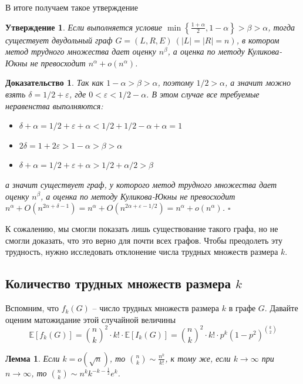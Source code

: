 \documentclass[a4paper]{article}
\newtheorem*{mclaim}{Утверждение}
\newtheorem*{mlemma}{Лемма}
\newtheorem*{msolution}{Доказательство}
\begin{document}
В итоге получаем такое утверждение 
\begin{mclaim}
    Если выполняется условие $\min\left\{\frac{1+\alpha}{2},1-\alpha\right\} > \beta > \alpha$, тогда 
    существует двудольный граф $G = (L, R, E)\ (|L| = |R| = n)$, в котором метод трудного множества 
    дает оценку $n^\beta$, а оценка по методу Куликова-Юкны не превосходит $n^\alpha + o(n^{\alpha})$.
\end{mclaim}
\begin{msolution}
    Так как $1-\alpha > \beta > \alpha$, поэтому $1/2 > \alpha$, а значит можно взять $\delta = 1/2 +
    \varepsilon$, где $0 < \varepsilon < 1/2 - \alpha$. В этом случае все требуемые неравенства выполняются:
    \begin{itemize}[noitemsep]
        \item $\delta + \alpha = 1/2 + \varepsilon + \alpha < 1/2 + 1/2 - \alpha + \alpha = 1$
        \item $2\delta = 1 + 2\varepsilon > 1 - \alpha > \beta > \alpha$
        \item $\delta + \alpha = 1/2 + \varepsilon + \alpha > 1/2 + \alpha/2 > \beta$
    \end{itemize}
    а значит существует граф, у которого метод трудного множества дает оценку $n^{\beta}$, 
    а оценка по методу Куликова-Юкны не превосходит $n^\alpha + O(n^{2\alpha + \delta - 1}) = 
    n^\alpha + O(n^{2\alpha + \varepsilon - 1/2}) = n^{\alpha} + o(n^{\alpha})$. $\square$
\end{msolution}


К сожалению, мы смогли показать лишь существование такого графа, но не смогли доказать, что это верно 
для почти всех графов. Чтобы преодолеть эту трудность, нужно исследовать отклонение числа трудных множеств 
размера $k$.

\subsection{Количество трудных множеств размера $k$}

Вспомним, что $f_k(G)$ -- число трудных множеств размера $k$ в графе $G$. Давайте оценим 
матожидание этой случайной величины $$\mathbb{E}[f_k(G)] = \binom{n}{k}^2\cdot k!\cdot \mathbb{E}[I_k(G)] = 
\binom{n}{k}^2\cdot k!\cdot p^k(1-p^2)^{\binom{k}{2}}$$

\begin{mlemma}
    Если $k = o(\sqrt{n})$, то $\binom{n}{k} \sim \frac{n^k}{k!}$, к тому же, если $k \rightarrow \infty$ 
    при $n \rightarrow \infty$, то $\binom{n}{k} \sim n^k k^{-k-\frac{1}{2}}e^k$.
\end{mlemma}
\end{document}
